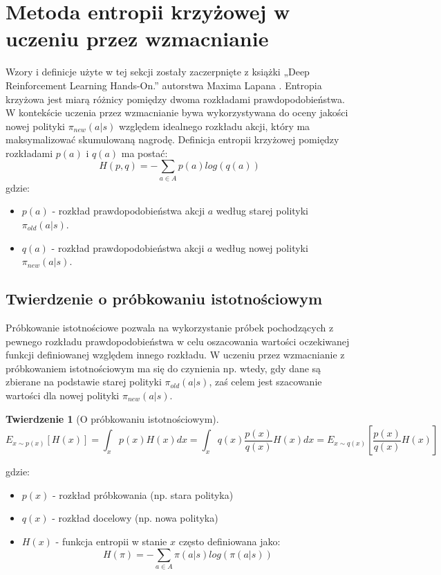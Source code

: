 \documentclass[a4paper, 12pt]{article}
\newtheorem{theorem}{Twierdzenie} %
\numberwithin{equation}{section}
\begin{document}
    \section{Metoda entropii krzyżowej w uczeniu przez wzmacnianie}
    Wzory i definicje użyte w tej sekcji zostały zaczerpnięte z książki „Deep Reinforcement Learning Hands-On.” autorstwa Maxima Lapana \cite{lapan2020deep}.
    Entropia krzyżowa jest miarą różnicy pomiędzy dwoma rozkładami prawdopodobieństwa. W kontekście uczenia przez wzmacnianie bywa wykorzystywana do oceny jakości nowej polityki \( \pi_{new} (a|s) \) względem idealnego rozkładu akcji, który ma maksymalizować skumulowaną nagrodę. Definicja entropii krzyżowej pomiędzy rozkładami \( p(a) \) i \( q(a) \) ma postać:
    \begin{equation}
    H(p,q) = - \sum_{a \in A} p(a) log(q(a))
    \end{equation}
    gdzie:
    \begin{itemize}
        \item \( p(a) \) - rozkład prawdopodobieństwa akcji \( a \) według starej polityki \( \pi_{old}(a|s) \).
        \item \( q(a) \) - rozkład prawdopodobieństwa akcji \( a \) według nowej polityki \( \pi_{new} (a|s) \).
    \end{itemize} 
    \subsection{Twierdzenie o próbkowaniu istotnościowym}
    Próbkowanie istotnościowe pozwala na wykorzystanie próbek pochodzących z pewnego rozkładu prawdopodobieństwa w celu oszacowania wartości oczekiwanej funkcji definiowanej względem innego rozkładu. W uczeniu przez wzmacnianie z próbkowaniem istotnościowym ma się do czynienia np. wtedy, gdy dane są zbierane na podstawie starej polityki \( \pi_{old}(a|s) \), zaś celem jest szacowanie wartości dla nowej polityki \( \pi_{new} (a|s) \).
    \begin{theorem}[O próbkowaniu istotnościowym]
    \begin{equation}
    E_{x \sim p(x)} [H(x)] = \int_{x} p(x)H(x) dx = \int_{x} q(x) \frac{p(x)}{q(x)} H(x) dx = E_{x \sim q(x)} [\frac{p(x)}{q(x)}H(x)]
    \end{equation}
    \end{theorem}
    gdzie:
    \begin{itemize}
        \item \( p(x) \) - rozkład próbkowania (np. stara polityka)
        \item \( q(x) \) - rozkład docelowy (np. nowa polityka)
        \item \( H(x) \) - funkcja entropii w stanie \( x \) często definiowana jako:
        \begin{equation}
        H(\pi) = - \sum_{a \in A} \pi(a|s)log(\pi(a|s)) 
        \end{equation}
    \end{itemize}
\end{document}
